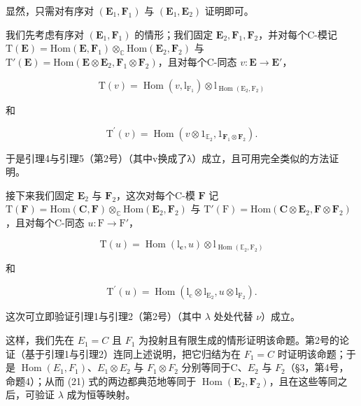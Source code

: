 显然，只需对有序对 \((\mathbf{E}_{1}, \mathbf{F}_{1})\) 与 \((\mathbf{E}_{1}, \mathbf{E}_{2})\) 证明即可。

我们先考虑有序对 \((\mathbf{E}_1, \mathbf{F}_1)\) 的情形；我们固定 \(\mathbf{E}_2, \mathbf{F}_1, \mathbf{F}_2\)，并对每个C-模记 \(\mathrm{T}(\mathbf{E}) = \mathrm{Hom}(\mathbf{E}, \mathbf{F}_1) \otimes_{\mathbb{C}} \mathrm{Hom}(\mathbf{E}_2, \mathbf{F}_2)\) 与 \(\mathrm{T}'(\mathbf{E}) = \mathrm{Hom}(\mathbf{E} \otimes \mathbf{E}_2, \mathbf{F}_1 \otimes \mathbf{F}_2)\)，且对每个C-同态 \(v: \mathbf{E} \to \mathbf{E}'\)，

\[
\mathrm{T} (v) = \operatorname{Hom} (v, \mathrm{l} _ {\mathrm{F} _ {1}}) \otimes \mathrm{l} _ {\operatorname{Hom} (\mathrm{E} _ {2}, \mathrm{F} _ {2})}
\]

和

\[
\mathrm{T} ^ {\prime} (v) = \operatorname{Hom} (v \otimes 1 _ {\mathbb {E} _ {2}}, 1 _ {\mathbf {F} _ {1} \otimes \mathbf {F} _ {2}}).
\]

于是引理4与引理5（第2号）（其中v换成了λ）成立，且可用完全类似的方法证明。

接下来我们固定 \(\mathbf{E}_2\) 与 \(\mathbf{F}_2\)，这次对每个C-模 \(\mathbf{F}\) 记 \(\mathrm{T}(\mathbf{F}) = \mathrm{Hom}(\mathbf{C},\mathbf{F})\otimes_{\mathbb{C}}\mathrm{Hom}(\mathbf{E}_2,\mathbf{F}_2)\) 与 \(\mathrm{T}'(\mathrm{F}) = \mathrm{Hom}(\mathbf{C}\otimes \mathbf{E}_2,\mathbf{F}\otimes \mathbf{F}_2)\)，且对每个C-同态 \(u:\mathrm{F}\to \mathrm{F}'\)，

\[
\mathrm{T} (u) = \operatorname{Hom} (\mathrm{l} _ {\mathbf {c}}, u) \otimes \mathrm{l} _ {\operatorname{Hom} (\mathbb {E} _ {2}, \mathrm{F} _ {2})}
\]

和

\[
\mathrm{T} ^ {\prime} (u) = \operatorname{Hom} (\mathrm{l} _ {\mathrm{c}} \otimes \mathrm{l} _ {\mathrm{E} _ {2}}, u \otimes \mathrm{l} _ {\mathrm{F} _ {2}}).
\]

这次可立即验证引理1与引理2（第2号）（其中 \(\lambda\) 处处代替 \(\nu\)）成立。

这样，我们先在 \(E_{1} = C\) 且 \(F_{1}\) 为投射且有限生成的情形证明该命题。第2号的论证（基于引理1与引理2）连同上述说明，把它归结为在 \(F_{1} = C\) 时证明该命题；于是 \(\operatorname{Hom}(E_{1}, F_{1})\)、\(E_{1} \otimes E_{2}\) 与 \(F_{1} \otimes F_{2}\) 分别等同于C、\(E_{2}\) 与 \(F_{2}\)（§3，第4号，命题4）；从而 (21) 式的两边都典范地等同于 \(\operatorname{Hom}(\mathbf{E}_{2},\mathbf{F}_{2})\)，且在这些等同之后，可验证 \(\lambda\) 成为恒等映射。

